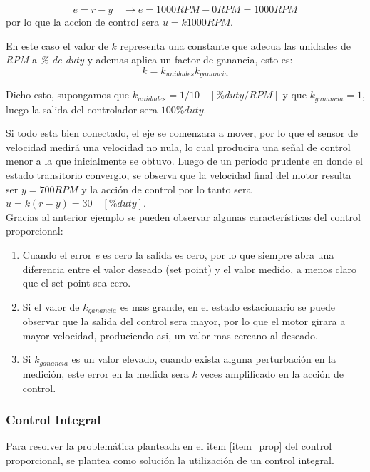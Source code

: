 \documentclass[10pt,conference,a4paper,onecolumn]{article}%
\begin{document}
 \begin{equation*}
e=r-y \quad \rightarrow e=1000RPM - 0RPM =1000RPM
\end{equation*}
por lo que la accion de control sera $u=k 1000RPM$.

En este caso el valor de $k$ representa una constante que adecua las unidades de \textit{RPM} a \textit{\% de duty} y ademas aplica un factor de ganancia, esto es:
 \begin{equation*}
k=k_{unidades}k_{ganancia}
\end{equation*}
 
 Dicho esto, supongamos que $k_{unidades}=1/10 \quad [\%duty/RPM]$ y que $k_{ganancia}=1$, luego la salida del controlador sera $100 \%duty$.
 
 Si todo esta bien conectado, el eje se comenzara a mover, por lo que el sensor de velocidad medirá una velocidad no nula, lo cual producira una señal de control menor a la que inicialmente se obtuvo. Luego de un periodo prudente en donde el estado transitorio convergio, se observa que la velocidad final del motor resulta ser $y=700RPM$ y la acción de control por lo tanto sera $u=k(r-y)=30\quad [\%duty]$. \\
 
 
 Gracias al anterior ejemplo se pueden observar algunas características del control proporcional:
 \begin{enumerate}
 \item \label{item_prop} Cuando el error \textit{e} es cero la salida es cero, por lo que siempre abra una diferencia entre el valor deseado (set point) y el valor medido, a menos claro que el set point sea cero.
 \item Si el valor de $k_{ganancia}$ es mas grande, en el estado estacionario se puede observar que la salida del control sera mayor, por lo que el motor girara a mayor velocidad, produciendo asi, un valor mas cercano al deseado.
 \item Si $k_{ganancia}$ es un valor elevado, cuando exista alguna perturbación en la medición, este error en la medida sera \textit{k} veces amplificado en la acción de control. 
 \end{enumerate}
 
 
 \subsubsection{Control Integral}

Para resolver la problemática planteada en el item \ref{item_prop} del control proporcional, se plantea como solución la utilización de un control integral. 
\end{document}
